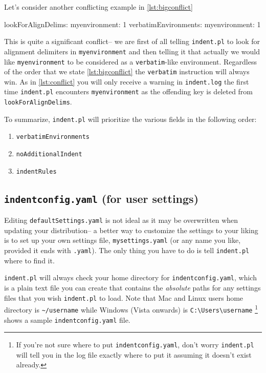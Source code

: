 Let's consider another conflicting example in \cref{lst:bigconflict}
\begin{yaml}[caption={More conflicting ideas},label={lst:bigconflict}]
lookForAlignDelims:
   myenvironment: 1
verbatimEnvironments:
   myenvironment: 1
\end{yaml}
This is quite a significant conflict-- we are first of all telling \lstinline!indent.pl!
to look for alignment delimiters in \lstinline!myenvironment! and then 
telling it that actually we would like \lstinline!myenvironment! to be considered 
as a \lstinline!verbatim!-like environment. Regardless of the order that we 
state \cref{lst:bigconflict} the \lstinline!verbatim! instruction will always win.
As in \cref{lst:conflict} you will only receive a warning in \lstinline!indent.log! the 
first time \lstinline!indent.pl! encounters \lstinline!myenvironment! as the 
offending key is deleted from \lstinline!lookForAlignDelims!.
 	 	 	 	 	
To summarize, \lstinline!indent.pl! will prioritize the various fields in the 
following order:
\begin{enumerate}
	\item \lstinline!verbatimEnvironments!
	\item \lstinline!noAdditionalIndent!
	\item \lstinline!indentRules!
\end{enumerate}
\subsection{\lstinline!indentconfig.yaml! (for user settings)}\label{sec:indentconfig}
Editing \lstinline!defaultSettings.yaml! is not ideal as it may be overwritten when 
updating your distribution-- a better way to customize the settings to your liking 
is to set up your own settings file, 
\lstinline!mysettings.yaml! (or any name you like, provided it ends with \lstinline!.yaml!). 
The only thing you have to do is tell \lstinline!indent.pl! where to find it. 
 	 	 	 	 	
\lstinline!indent.pl! will always check your home directory for \lstinline!indentconfig.yaml!, 
which is a plain text file you can create that contains the \emph{absolute}
paths for any settings files that you wish \lstinline!indent.pl! to load.
Note that Mac and Linux users home directory is \lstinline!~/username! while
Windows (Vista onwards) is \lstinline!C:\Users\username! \footnote{If you're not sure 
where to put \lstinline!indentconfig.yaml!, don't 
worry \lstinline!indent.pl! will tell you in the log file exactly where to 
put it assuming it doesn't exist already.}
 shows a sample \lstinline!indentconfig.yaml! file.
 	 	 	 	 	

